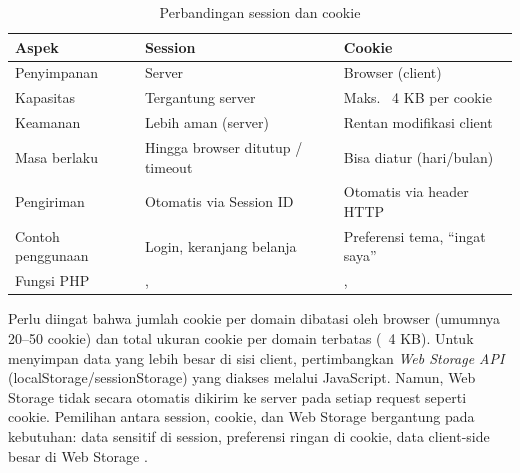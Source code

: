 \begin{table}[H]
\centering
\begin{tabular}{|P{3cm}|P{5cm}|P{5cm}|}
\hline
\textbf{Aspek} & \textbf{Session} & \textbf{Cookie} \\
\hline
Penyimpanan & Server & Browser (client) \\
\hline
Kapasitas & Tergantung server & Maks. ~4 KB per cookie \\
\hline
Keamanan & Lebih aman (server) & Rentan modifikasi client \\
\hline
Masa berlaku & Hingga browser ditutup / timeout & Bisa diatur (hari/bulan) \\
\hline
Pengiriman & Otomatis via Session ID & Otomatis via header HTTP \\
\hline
Contoh penggunaan & Login, keranjang belanja & Preferensi tema, ``ingat saya'' \\
\hline
Fungsi PHP & ,  & ,  \\
\hline
\end{tabular}
\caption{Perbandingan session dan cookie}
\end{table}

Perlu diingat bahwa jumlah cookie per domain dibatasi oleh browser (umumnya 20--50 cookie) dan total ukuran cookie per domain terbatas (~4 KB). Untuk menyimpan data yang lebih besar di sisi client, pertimbangkan \textit{Web Storage API} (localStorage/sessionStorage) yang diakses melalui JavaScript. Namun, Web Storage tidak secara otomatis dikirim ke server pada setiap request seperti cookie. Pemilihan antara session, cookie, dan Web Storage bergantung pada kebutuhan: data sensitif di session, preferensi ringan di cookie, data client-side besar di Web Storage \cite{phpManual}.

